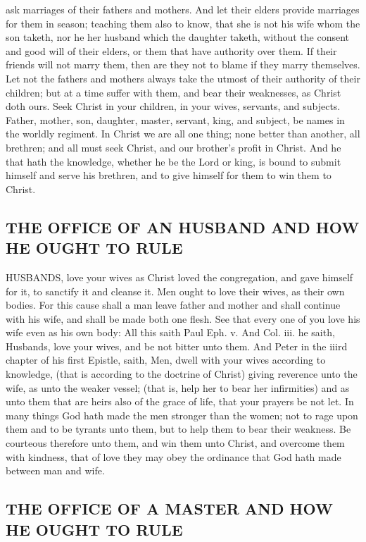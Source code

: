 ask marriages of their fathers and mothers. And let their 
elders provide marriages for them in season; teaching 
them also to know, that she is not his wife whom the son 
taketh, nor he her husband which the daughter taketh, 
without the consent and good will of their elders, or them 
that have authority over them. If their friends will not 
marry them, then are they not to blame if they marry 
themselves. Let not the fathers and mothers always take 
the utmost of their authority of their children; but at a 
time suffer with them, and bear their weaknesses, as Christ 
doth ours. Seek Christ in your children, in your wives, 
servants, and subjects. Father, mother, son, daughter, 
master, servant, king, and subject, be names in the worldly 
regiment. In Christ we are all one thing; none better 
than another, all brethren; and all must seek Christ, and 
our brother's profit in Christ. And he that hath the 
knowledge, whether he be the Lord or king, is bound to 
submit himself and serve his brethren, and to give himself 
for them to win them to Christ. 


\subsection*{THE OFFICE OF AN HUSBAND AND HOW HE OUGHT TO RULE}

HUSBANDS, love your wives as Christ loved the congregation,
and gave himself for it, to sanctify it and 
cleanse it. Men ought to love their wives, as their own 
bodies. For this cause shall a man leave father and mother 
and shall continue with his wife, and shall be made both 
one flesh. See that every one of you love his wife even as 
his own body: All this saith Paul Eph. v. And Col. iii. 
he saith, Husbands, love your wives, and be not bitter unto 
them. And Peter in the iiird chapter of his first Epistle, 
saith, Men, dwell with your wives according to knowledge, 
(that is according to the doctrine of Christ) giving reverence
unto the wife, as unto the weaker vessel; (that is, 
help her to bear her infirmities) and as unto them that are 
heirs also of the grace of life, that your prayers be not let. 
In many things God hath made the men stronger than the 
women; not to rage upon them and to be tyrants unto them, 
but to help them to bear their weakness. Be courteous
therefore unto them, and win them unto Christ, and 
overcome them with kindness, that of love they may obey 
the ordinance that God hath made between man and wife. 


\subsection*{THE OFFICE OF A MASTER AND HOW HE OUGHT TO RULE}


